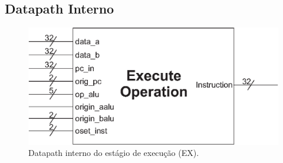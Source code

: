 	\subsection{Datapath Interno}
	
	\begin{figure}[ht]
		\begin{center}
		\includegraphics[scale = 0.5]{./datapath/Graphic3.eps}
		\caption*{Datapath interno do estágio de execução (EX).}
		\end{center}
	\end{figure}

